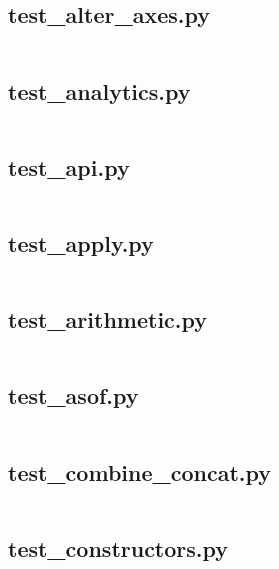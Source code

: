 \documentclass{article}
\begin{document}
\subsection{test\_alter\_axes.py}
\inputminted{python}{/home/dufferzafar/dev/@clones/pandas/pandas/tests/series/test_alter_axes.py}
\newpage

\subsection{test\_analytics.py}
\inputminted{python}{/home/dufferzafar/dev/@clones/pandas/pandas/tests/series/test_analytics.py}
\newpage

\subsection{test\_api.py}
\inputminted{python}{/home/dufferzafar/dev/@clones/pandas/pandas/tests/series/test_api.py}
\newpage

\subsection{test\_apply.py}
\inputminted{python}{/home/dufferzafar/dev/@clones/pandas/pandas/tests/series/test_apply.py}
\newpage

\subsection{test\_arithmetic.py}
\inputminted{python}{/home/dufferzafar/dev/@clones/pandas/pandas/tests/series/test_arithmetic.py}
\newpage

\subsection{test\_asof.py}
\inputminted{python}{/home/dufferzafar/dev/@clones/pandas/pandas/tests/series/test_asof.py}
\newpage

\subsection{test\_combine\_concat.py}
\inputminted{python}{/home/dufferzafar/dev/@clones/pandas/pandas/tests/series/test_combine_concat.py}
\newpage

\subsection{test\_constructors.py}
\inputminted{python}{/home/dufferzafar/dev/@clones/pandas/pandas/tests/series/test_constructors.py}
\newpage
\end{document}
